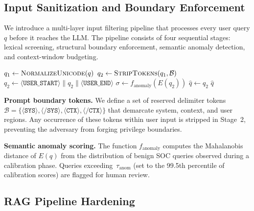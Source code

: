 \subsection{Input Sanitization and Boundary Enforcement}
\label{sec:defense:input}

We introduce a multi-layer input filtering pipeline that processes
every user query $q$ before it reaches the LLM.  The pipeline consists
of four sequential stages: lexical screening, structural boundary
enforcement, semantic anomaly detection, and context-window budgeting.

\begin{algorithm}[t]
\caption{Input Sanitization Pipeline}\label{alg:sanitize}
\BlankLine
{}
$q_1 \gets \textsc{NormalizeUnicode}(q)$\;
$q_2 \gets \textsc{StripTokens}(q_1, \mathcal{B})$\;
$q_2 \gets \langle\texttt{USER\_START}\rangle \| q_2 \| \langle\texttt{USER\_END}\rangle$\;
$\sigma \gets f_{\text{anomaly}}(E(q_2))$\;
$\hat{q} \gets q_2$\;
\Return $\hat{q}$\;
\end{algorithm}

\textbf{Prompt boundary tokens.}
We define a set of reserved delimiter tokens
$\mathcal{B} = \{\langle\texttt{SYS}\rangle, \langle\texttt{/SYS}\rangle,
\langle\texttt{CTX}\rangle, \langle\texttt{/CTX}\rangle\}$ that
demarcate system, context, and user regions.  Any occurrence of these
tokens within user input is stripped in Stage~2, preventing the
adversary from forging privilege boundaries.

\textbf{Semantic anomaly scoring.}
The function $f_{\text{anomaly}}$ computes the Mahalanobis distance
of $E(q)$ from the distribution of benign SOC queries observed during
a calibration phase.  Queries exceeding~$\tau_{\text{anom}}$ (set to
the 99.5th percentile of calibration scores) are flagged for human
review.

\subsection{RAG Pipeline Hardening}
\label{sec:defense:rag}

